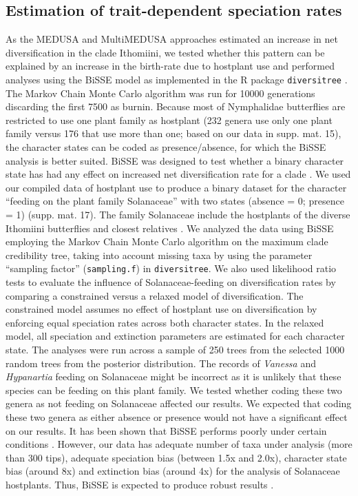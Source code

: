 \documentclass[10pt]{article}
\begin{document}
\subsection*{Estimation of trait-dependent speciation
rates}

As the MEDUSA and MultiMEDUSA approaches estimated an increase in net
diversification in the clade Ithomiini, we tested whether this pattern
can be explained by an increase in the birth-rate due to hostplant use
and performed analyses using the BiSSE model \cite{maddison2007} 
as implemented in the R package
\texttt{diversitree} \cite{fitzjohn2012}. The Markov Chain Monte Carlo algorithm
was run for 10000 generations discarding the first 7500 as burnin.
Because most of Nymphalidae butterflies are restricted to
use one plant family as hostplant (232 genera use only one plant family
versus 176 that use more than one; based on our data in supp. mat. 15),
the character states can be coded as presence/absence, for which the
BiSSE analysis is better suited. BiSSE was designed to test whether a
binary character state has had any effect on increased net
diversification rate for a clade \cite{maddison2007}. We used our compiled data of
hostplant use to produce a binary dataset for the character ``feeding on
the plant family Solanaceae'' with two states (absence = 0; presence =
1) (supp. mat. 17). The family Solanaceae include the hostplants of the
diverse Ithomiini butterflies and closest relatives \cite{willmott2006}. 
We analyzed the data using BiSSE employing the Markov Chain
Monte Carlo algorithm on the maximum clade credibility tree, taking into
account missing taxa by using the parameter ``sampling factor''
(\texttt{sampling.f}) in \texttt{diversitree}. 
We also used likelihood ratio tests to evaluate the influence of
Solanaceae-feeding on diversification rates by comparing a constrained versus
a relaxed model of diversification.
The constrained model assumes no effect of hostplant use on diversification by
enforcing equal speciation rates across both character states. In the relaxed
model, all speciation and extinction parameters are estimated for each
character state.
The analyses were run across a sample of 250
trees from the selected 1000 random trees from the posterior
distribution. The records of \emph{Vanessa} and \emph{Hypanartia}
feeding on Solanaceae \cite{beccaloni2008, scott1986} might be incorrect as it is unlikely
that these species can be feeding on this plant family. We tested
whether coding these two genera as not feeding on Solanaceae affected
our results. We expected that coding these two genera as either absence
or presence would not have a significant effect on our results. It has
been shown that BiSSE performs poorly under certain conditions \cite{davis2013}.
However, our data has adequate number of taxa under analysis (more than
300 tips), adequate speciation bias (between 1.5x and 2.0x), character
state bias (around 8x) and extinction bias (around 4x) for the analysis
of Solanaceae hostplants. Thus, BiSSE is expected to produce robust
results \cite{davis2013}.
\end{document}
